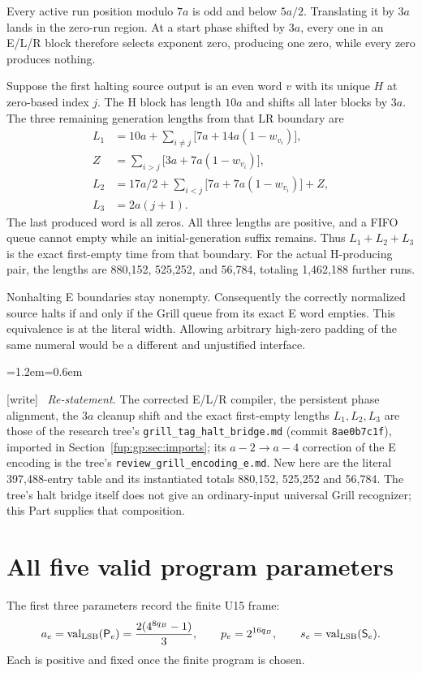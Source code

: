\documentclass[11pt,letterpaper]{article}
\theoremstyle{definition}\newtheorem{definition}[theorem]{Definition}
\theoremstyle{remark}\newtheorem{remark}[theorem]{Remark}
\newcommand{\val}{\operatorname{val}_{\rm LSB}}
\newcommand{\wtag}{\textup{[write]}}
\newenvironment{writenote}{\par\smallskip\begin{list}{}{\leftmargin=1.2em\rightmargin=0.6em}\item[]\small\wtag\ }{\end{list}\smallskip}
\newcommand{\rw}[1]{\nolinkurl{#1}}%
\begin{document}
Every active run position modulo $7a$ is odd and below $5a/2$. Translating it by $3a$ lands in the zero-run region. At a start phase shifted by $3a$, every one in an E/L/R block therefore selects exponent zero, producing one zero, while every zero produces nothing.

Suppose the first halting source output is an even word $v$ with its unique $H$ at zero-based index $j$. The H block has length $10a$ and shifts all later blocks by $3a$. The three remaining generation lengths from that LR boundary are
\begin{align*}
 L_1&=10a+\sum_{i\ne j}\bigl[7a+14a(1-w_{v_i})\bigr],\\
 Z&=\sum_{i>j}\bigl[3a+7a(1-w_{v_i})\bigr],\\
 L_2&=17a/2+\sum_{i<j}\bigl[7a+7a(1-w_{v_i})\bigr]+Z,\\
 L_3&=2a(j+1).
\end{align*}
The last produced word is all zeros. All three lengths are positive, and a FIFO queue cannot empty while an initial-generation suffix remains. Thus $L_1+L_2+L_3$ is the exact first-empty time from that boundary. For the actual H-producing pair, the lengths are 880,152, 525,252, and 56,784, totaling 1,462,188 further runs.

Nonhalting E boundaries stay nonempty. Consequently the correctly normalized source halts if and only if the Grill queue from its exact E word empties. This equivalence is at the literal width. Allowing arbitrary high-zero padding of the same numeral would be a different and unjustified interface.
\begin{writenote}
\emph{Re-statement.} The corrected E/L/R compiler, the persistent phase alignment, the $3a$ cleanup shift and the exact first-empty lengths $L_1,L_2,L_3$ are those of the research tree's \rw{grill_tag_halt_bridge.md} (commit \texttt{8ae0b7c1f}), imported in Section~\ref{fup:gp:sec:imports}; its $a-2\to a-4$ correction of the E encoding is the tree's \rw{review_grill_encoding_e.md}. New here are the literal 397,488-entry table and its instantiated totals 880,152, 525,252 and 56,784. The tree's halt bridge itself does not give an ordinary-input universal Grill recognizer; this Part supplies that composition.
\end{writenote}

\section{All five valid program parameters}\label{fup:gp:sec:parameters}
The first three parameters record the finite U15 frame:
\begin{equation}\label{fup:gp:eq:params1}
 a_e=\val(\mathsf P_e)=\frac{2(4^{8q_B}-1)}3,
 \qquad p_e=2^{16q_B},\qquad s_e=\val(\mathsf S_e).
\end{equation}
Each is positive and fixed once the finite program is chosen.
\end{document}
